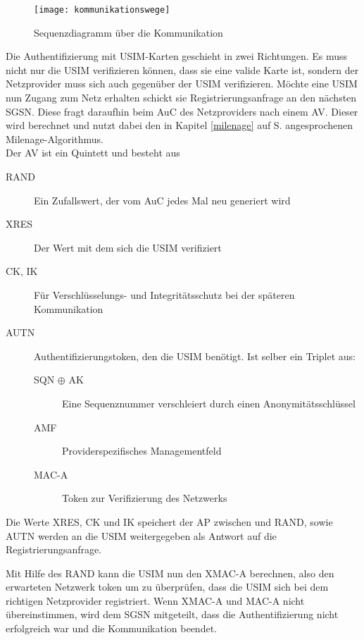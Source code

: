  \begin{figure}[htp]
 \begin{center}
  \texttt{[image: kommunikationswege]}
 \end{center}
 \caption[Sequenzdiagramm über die Kommunikation zwischen SIM-Karte und Authentication Center]{Sequenzdiagramm über die Kommunikation}
 \label{fig:kommunikationswege}
\end{figure}

 Die Authentifizierung mit \ac{USIM}-Karten geschieht in zwei Richtungen. Es muss nicht nur die
 USIM verifizieren können, dass sie eine valide Karte ist, sondern der Netzprovider muss sich auch
 gegenüber der USIM verifizieren. Möchte eine USIM nun Zugang zum Netz erhalten schickt sie
 Registrierungsanfrage an den nächsten \ac{SGSN}. Diese fragt daraufhin beim \ac{AuC} des
 Netzproviders nach einem \ac{AV}. Dieser wird berechnet und nutzt dabei den in Kapitel
 \ref{milenage} auf S. \pageref{milenage} angesprochenen Milenage-Algorithmus. \\
 Der AV ist ein Quintett und besteht aus
 
 \begin{description}
  \item [RAND] Ein Zufallswert, der vom AuC jedes Mal neu generiert wird
  \item [XRES] Der Wert mit dem sich die USIM verifiziert
  \item [CK, IK] Für Verschlüsselungs- und Integritätsschutz bei der späteren Kommunikation
  \item [AUTN] Authentifizierungstoken, den die USIM benötigt. Ist selber ein Triplet aus:
  \begin{description}
   \item [SQN $\oplus$ AK] Eine Sequenznummer verschleiert durch einen Anonymitätsschlüssel
   \item [AMF] Providerspezifisches Managementfeld
   \item [MAC-A] Token zur Verifizierung des Netzwerks
  \end{description}
 \end{description}
 
 Die Werte XRES, CK und IK speichert der AP zwischen und RAND, sowie AUTN werden an die USIM
 weitergegeben als Antwort auf die Registrierungsanfrage.

 Mit Hilfe des RAND kann die USIM nun den XMAC-A berechnen, also den erwarteten Netzwerk\-
 token um zu überprüfen, dass die USIM sich bei dem richtigen Netzprovider registriert. Wenn XMAC-A
 und MAC-A nicht übereinstimmen, wird dem SGSN mitgeteilt, dass die Authentifizierung nicht erfolgreich
 war und die Kommunikation beendet.

